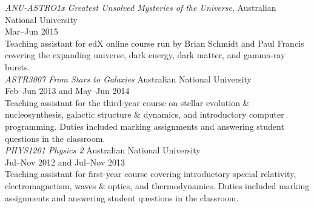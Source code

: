 \documentclass[11pt]{res} %
\begin{document}
\begin{resume}
  {\it ANU-ASTRO1x Greatest Unsolved Mysteries of the Universe}, \hfill Australian National University\\
  \null\hfill Mar--Jun 2015\\
  Teaching assistant for edX online course run by Brian Schmidt and Paul Francis covering the expanding universe, dark energy, dark matter, and gamma-ray bursts.\\

  {\it ASTR3007 From Stars to Galaxies} \hfill Australian National University\\
  \null\hfill Feb--Jun 2013 and May--Jun 2014\\
  Teaching assistant for the third-year course on stellar evolution \& nucleosynthesis, galactic structure \& dynamics, and introductory computer programming. Duties included marking assignments and answering student questions in the classroom.\\

  {\it PHYS1201 Physics 2} \hfill Australian National University\\
  \null\hfill Jul--Nov 2012 and Jul--Nov 2013\\
  Teaching assistant for first-year course covering introductory special relativity, electromagnetism, waves \& optics, and thermodynamics. Duties included marking assignments and answering student questions in the classroom.

\begin{comment}
\section{Referees}
  \textbf{Dr. Stuart Sim}\\
  Lecturer, Centre for Astrophysics Research\\
  Queen's University Belfast, UK\\
  stuart.sim@anu.edu.au

  \textbf{Dr. Amanda Karakas}\\
  Lecturer, School of Physics & Astronomy\\
  Monash University, Australia\\
  amanda.karakas@monash.edu

  \textbf{Prof. Gary Da Costa}\\
  Professor, Research School of Astronomy \& Astrophysics\\
  Australian National University\\
  gary.dacosta@anu.edu.au

\end{comment}
\end{resume}
\end{document}
